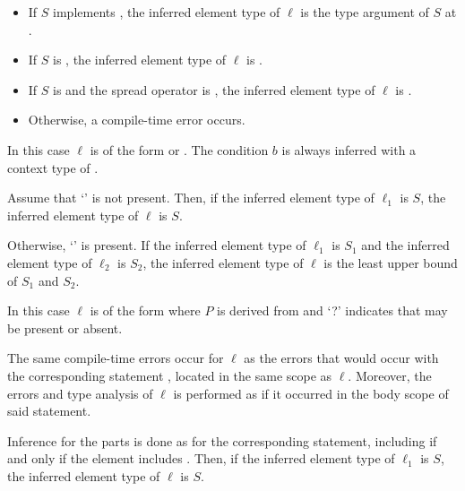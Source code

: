 \documentclass[makeidx]{article}
\begin{document}
{\begin{itemize}
\item
  If $S$ implements ,
  the inferred element type of $\ell$ is
  the type argument of $S$ at .
\item
  If $S$ is \DYNAMIC,
  the inferred element type of $\ell$ is \DYNAMIC.
\item
  If $S$ is  and the spread operator is ,
  the inferred element type of $\ell$ is .
\item
  Otherwise, a compile-time error occurs.
\end{itemize}
\vspace{-5mm}
\EndCase

\LMHash{}%
In this case $\ell$ is of the form
 or
.
The condition $b$ is always inferred with a context type of .

Assume that `' is not present.
Then, if the inferred element type of $\ell_1$ is $S$,
the inferred element type of $\ell$ is $S$.

Otherwise, `' is present.
If the inferred element type of $\ell_1$ is $S_1$ and
the inferred element type of $\ell_2$ is $S_2$,
the inferred element type of $\ell$ is
the least upper bound of $S_1$ and $S_2$.
\EndCase

\LMHash{}%
In this case $\ell$ is of the form
where $P$ is derived from  and
`\AWAIT?' indicates that \AWAIT{} may be present or absent.

The same compile-time errors occur for $\ell$ as
the errors that would occur with the corresponding \FOR{} statement
,
located in the same scope as $\ell$.
Moreover, the errors and type analysis of $\ell$ is performed
as if it occurred in the body scope of said \FOR{} statement.

Inference for the parts
is done as for the corresponding \FOR{} statement,
including \AWAIT{} if and only if the element includes \AWAIT.
Then, if the inferred element type of $\ell_1$ is $S$,
the inferred element type of $\ell$ is $S$.

}
\end{document}
